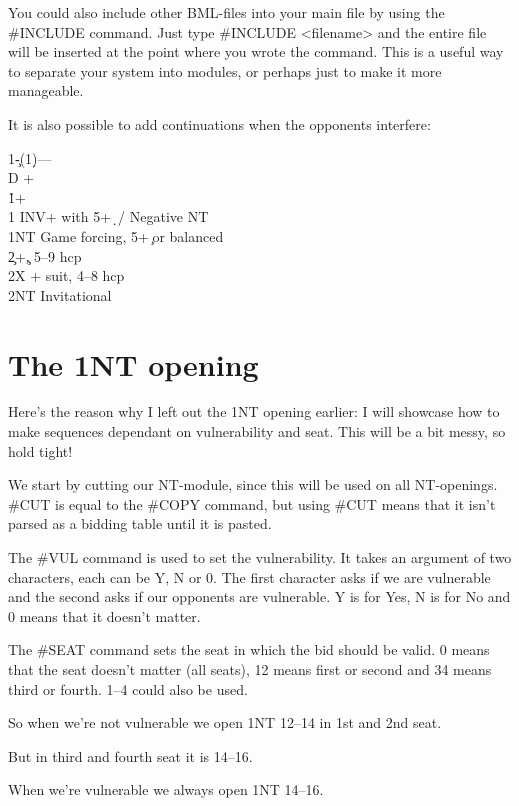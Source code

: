 \documentclass[a4paper]{article}
\begin{document}
You could also include other BML-files into your main file by using
the \#INCLUDE command. Just type \#INCLUDE <filename> and the entire
file will be inserted at the point where you wrote the command. This
is a useful way to separate your system into modules, or perhaps
just to make it more manageable.

It is also possible to add continuations when the opponents
interfere:

\begin{bidtable}
1\c-(1\d)---\\
D +\h\\
1\h {}+\s\\
1\s \> INV+ with 5+\d\ / Negative NT\\
1NT \> Game forcing, 5+\c\ or balanced\\
2\c {}+\c, 5--9 hcp\\
2X + suit, 4--8 hcp\\
2NT \> Invitational
\end{bidtable}

\section{The 1NT opening}

Here's the reason why I left out the 1NT opening earlier: I will
showcase how to make sequences dependant on vulnerability and
seat. This will be a bit messy, so hold tight!

We start by cutting our NT-module, since this will be used on all
NT-openings. \#CUT is equal to the \#COPY command, but using \#CUT
means that it isn't parsed as a bidding table until it is pasted.

The \#VUL command is used to set the vulnerability. It takes an
argument of two characters, each can be Y, N or 0. The first
character asks if we are vulnerable and the second asks if our
opponents are vulnerable. Y is for Yes, N is for No and 0 means that
it doesn't matter.

The \#SEAT command sets the seat in which the bid should be valid. 0
means that the seat doesn't matter (all seats), 12 means first or
second and 34 means third or fourth. 1--4 could also be used.

So when we're not vulnerable we open 1NT 12--14 in 1st and 2nd seat.

But in third and fourth seat it is 14--16.

When we're vulnerable we always open 1NT 14--16.
\end{document}
